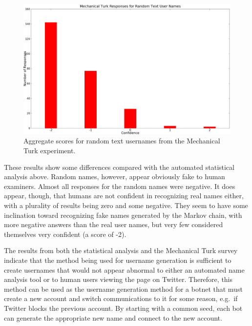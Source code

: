 \begin{figure}
\begin{minipage}{0.3\textwidth}
    \includegraphics[width=\columnwidth]{random-mturk-agg.eps}
    \caption{Aggregate scores for random text usernames from the Mechanical Turk experiment.}
    \label{fig:evaluation:usernames:random-mturk-agg}
\end{minipage}
\end{figure}

These results show some differences compared with the automated statistical
analysis above.  Random names, however, appear obviously fake to human examiners.
Almost all responses for the random names were negative.  It does appear, though,
that humans are not confident in recognizing real names either, with a plurality
of results being zero and some negative.  They seem to have some inclination toward
recognizing fake names generated by the Markov chain, with more negative answers
than the real user names, but very few considered themselves very confident (a score of -2).

The results from both the statistical analysis and the Mechanical Turk survey
indicate that the method being used for username generation is sufficient to
create usernames that would not appear abnormal to either an automated name
analysis tool or to human users viewing the page on Twitter.  Therefore, this
method can be used as the username generation method for a botnet that must
create a new account and switch communications to it for some reason, e.g.\ if
Twitter blocks the previous account.  By starting with a common seed, each bot
can generate the appropriate new name and connect to the new account.
